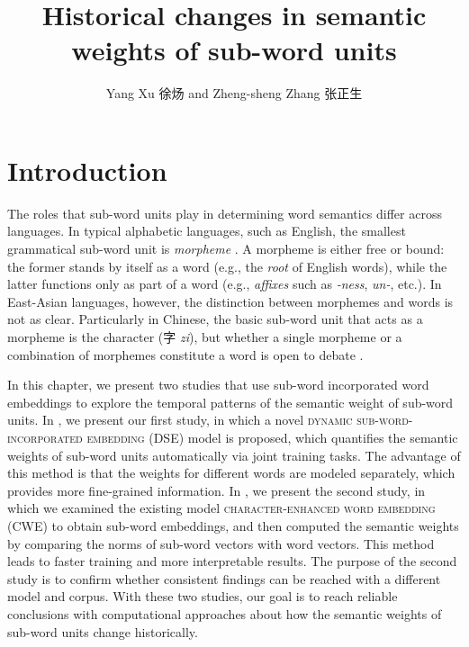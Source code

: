 \documentclass[output=paper]{langsci/langscibook}
\author[Yang Xu and Zheng-sheng Zhang]{Yang Xu {\cjkfont 徐炀}\orcid{}\affiliation{San Diego State University}  and
Zheng-sheng Zhang {\cjkfont 张正生}\orcid{}\affiliation{San Diego State University}}
\title{Historical changes in semantic weights of sub-word units}
\begin{document}
\maketitle






\section{Introduction}

The roles that sub-word units play in determining word semantics differ across languages. In typical alphabetic languages, such as English, the smallest grammatical sub-word unit is \emph{morpheme} \citep{katamba2015english}. A morpheme is either free or bound: the former stands by itself as a word (e.g., the \emph{root} of English words), while the latter functions only as part of a word (e.g., \emph{affixes} such as \emph{-ness}, \mbox{\emph{un-},} etc.). 
In East-Asian languages, however, the distinction between morphemes and words is not as clear. Particularly in Chinese, the basic sub-word unit that acts as a morpheme is the character ({\cjkfont 字} \textit{zi}), but whether a single morpheme or a combination of morphemes constitute a word is open to debate \citep{hsieh2016chinese}. 

In this chapter, we present two studies that use sub-word incorporated word embeddings to explore the temporal patterns of the semantic weight of sub-word units. 
In , we present our first study, in which a novel \textsc{dynamic sub-word-incorporated embedding} (DSE) model is proposed, which quantifies the semantic weights of sub-word units automatically via joint training tasks. The advantage of this method is that the weights for different words are modeled separately, which provides more fine-grained information. 
In , we present the second study, in which we examined the existing model \textsc{character-enhanced word embedding} (CWE) to obtain sub-word embeddings, and then computed the semantic weights by comparing the norms of sub-word vectors with word vectors. This method leads to faster training and more interpretable results. The purpose of the second study is to confirm whether consistent findings can be reached with a different model and corpus.
With these two studies, our goal is to reach reliable conclusions with computational approaches about how the semantic weights of sub-word units change historically. 
\end{document}
